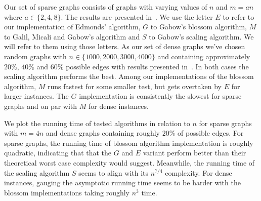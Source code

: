 Our set of sparse graphs consists of graphs with varying values of $n$ and $m = a n$ where $a \in \{2, 4, 8 \}$. The results are presented in~. We use the letter $E$ to refer to our implementation of Edmonds' algorithm, $G$ to Gabow's blossom algorithm, $M$ to Galil, Micali and Gabow's algorithm and $S$ to Gabow's scaling algorithm. We will refer to them using those letters. 
As our set of dense graphs we've chosen random graphs with $n \in \{ 1000, 2000, 3000, 4000 \}$ and containing approximately $20\%$, $40\%$ and $60\%$ possible edges with results presented in~. In both cases the scaling algorithm performs the best. Among our implementations of the blossom algorithm, $M$ runs fastest for some smaller test, but gets overtaken by $E$ for larger instances. The $G$ implementation is consistently the slowest for sparse graphs and on par with $M$ for dense instances.

We plot the running time of tested algorithms in relation to $n$ for sparse graphs with $m = 4 n$ and dense graphs containing roughly $20\%$ of possible edges. For sparse graphs, the running time of blossom algorithm implementation is roughly quadratic, indicating that that the $G$ and $E$ variant perform better than their theoretical worst case complexity would suggest. Meanwhile, the running time of the scaling algorithm $S$ seems to align with its $n^{7/4}$ complexity. For dense instances, gauging the asymptotic running time seems to be harder with the blossom implementations taking roughly $n^3$ time. 


